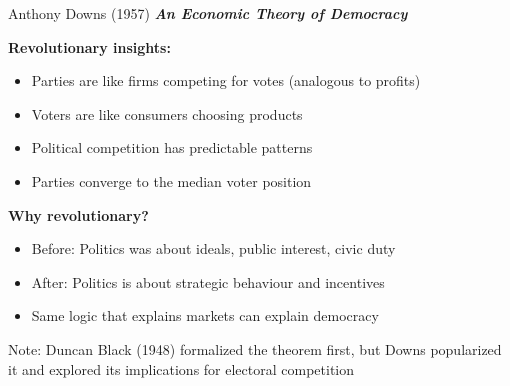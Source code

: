 \documentclass[10pt]{beamer}
\begin{document}
\begin{frame}{Anthony Downs (1957)}
\textbf{\textit{An Economic Theory of Democracy}}


\textbf{Revolutionary insights:}
\begin{itemize}
\item Parties are like firms competing for votes (analogous to profits)
\item Voters are like consumers choosing products
\item Political competition has predictable patterns
\item \alert{Parties converge to the median voter position}
\end{itemize}



\textbf{Why revolutionary?}
\begin{itemize}
\item Before: Politics was about ideals, public interest, civic duty
\item After: Politics is about strategic behaviour and incentives
\item Same logic that explains markets can explain democracy
\end{itemize}



\small{Note: Duncan Black (1948) formalized the theorem first, but Downs popularized it and explored its implications for electoral competition}
\end{frame}
\end{document}
